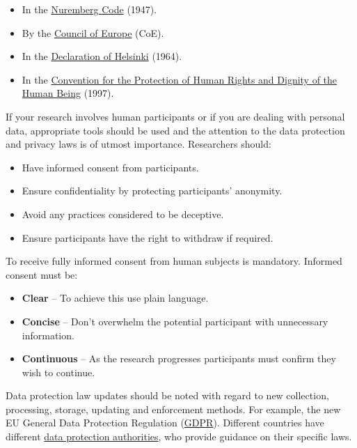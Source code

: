 \documentclass[
]{book}
\begin{document}
\begin{itemize}
\item
  In the \href{https://en.wikipedia.org/wiki/Nuremberg_Code}{Nuremberg Code} (1947).
\item
  By the \href{https://www.coe.int/en/web/portal}{Council of Europe} (CoE).
\item
  In the \href{https://www.wma.net/policies-post/wma-declaration-of-helsinki-ethical-principles-for-medical-research-involving-human-subjects/\#:~:text=1.,identifiable\%20human\%20material\%20and\%20data.}{Declaration of Helsinki} (1964).
\item
  In the \href{https://docs.google.com/document/u/0/d/1oUTVCqSzDajLWZAlSkFwHX8XZrolNDDayX1I3OtkzRs/edit}{Convention for the Protection of Human Rights and Dignity of the Human Being} (1997).
\end{itemize}

If your research involves human participants or if you are dealing with personal data, appropriate tools should be used and the attention to the data protection and privacy laws is of utmost importance. Researchers should:

\begin{itemize}
\item
  Have informed consent from participants.
\item
  Ensure confidentiality by protecting participants' anonymity.
\item
  Avoid any practices considered to be deceptive.
\item
  Ensure participants have the right to withdraw if required.
\end{itemize}

To receive fully informed consent from human subjects is mandatory. Informed consent must be:

\begin{itemize}
\item
  \textbf{Clear} -- To achieve this use plain language.
\item
  \textbf{Concise} -- Don't overwhelm the potential participant with unnecessary information.
\item
  \textbf{Continuous} -- As the research progresses participants must confirm they wish to continue.
\end{itemize}

Data protection law updates should be noted with regard to new collection, processing, storage, updating and enforcement methods. For example, the new EU General Data Protection Regulation (\href{https://gdpr.eu/what-is-gdpr/}{GDPR}). Different countries have different \href{https://en.wikipedia.org/wiki/National_data_protection_authority}{data protection authorities}, who provide guidance on their specific laws.
\end{document}
